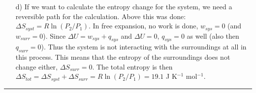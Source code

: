 \begin{itemize}
\item[d)] If we want to calculate the entropy change for the system, we need a reversible path for the calculation. Above this was done: $\Delta S_{syst} = R\ln(P_2/P_1)$. In free expansion, no work is done, $w_{sys} = 0$ (and $w_{surr} = 0$). Since $\Delta U = w_{sys} + q_{sys}$ and $\Delta U = 0$, $q_{sys} = 0$ as well (also then $q_{surr} = 0$). Thus the system is not interacting with the surroundings at all in this process. This means that the entropy of the surroundings does not change either, $\Delta S_{surr} =
0$. The total entropy is then $\Delta S_{tot} = \Delta S_{syst} + \Delta S_{surr} = R\ln(P_2/P_1) = 19.1$ J K$^{-1}$ mol$^{-1}$.

\end{itemize}

\hrule\vspace{0.5cm}

